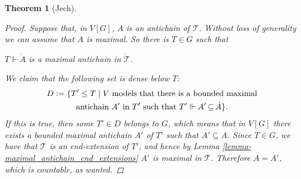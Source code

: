 \documentclass[11pt,a4paper]{report}
\newtheorem{theorem}{Theorem}[chapter] %
\theoremstyle{definition}
\theoremstyle{num.custom-title}
\theoremstyle{custom-title}
\DeclareMathOperator{\sse}{\subseteq}
\newcommand{\T}{\mathcal{T}}
\newcommand*{\defeq}{\mathrel{\rlap{%
                     \raisebox{0.3ex}{$\cdot$}}%
                     \raisebox{-0.3ex}{$\cdot$}}%
                     =}
\newcommand{\forces}{\Vdash}
\begin{document}
\begin{theorem}[Jech]
\begin{proof}
Suppose that, in $V[G]$, $A$ is an antichain of $\T$. Without loss of generality we can assume that $A$ is maximal. So there is $T \in G$ such that
\begin{center}
$T \forces \dot{A}$ is a maximal antichain in $\dot{\T}$.
\end{center}
We claim that the following set is dense below $T$:
\begin{multline*}
D \defeq \{T' \leq T \mid V \text{ models that there is a bounded maximal}\\
\text{antichain $A'$ in $T'$ such that } T' \forces A' \sse \dot{A} \}.
\end{multline*}
If this is true, then some $T' \in D$ belongs to $G$, which means that in $V[G]$ there exists a bounded maximal antichain $A'$ of $T'$ such that $A' \sse A$. Since $T \in G$, we have that $\T$ is an end-extension of $T'$, and hence by Lemma \ref{lemma-maximal_antichain_end_extensions} $A'$ is maximal in $\T$. Therefore $A=A'$, which is countable, as wanted.
%
%
%
%

\end{proof}
\end{theorem}
\end{document}
